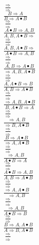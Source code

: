 \documentclass[11pt]{article}
\begin{document}
\begin{center}
\bigskip
\\$\frac{\Rightarrow }{\Rightarrow }$
\bigskip
\\$\frac{B\Rightarrow A}{B\Rightarrow A\bullet B}$
\bigskip
\\$\frac{\Rightarrow }{\Rightarrow }$
\bigskip
\\$\frac{A\bullet B\Rightarrow A, B}{A, B, A\bullet B\Rightarrow }$
\bigskip
\\$\frac{\Rightarrow }{\Rightarrow }$
\bigskip
\\$\frac{A, B, A\bullet B\Rightarrow }{A\bullet B\Rightarrow A, B}$
\bigskip
\\$\frac{\Rightarrow }{\Rightarrow }$
\bigskip
\\$\frac{A, B\Rightarrow A\bullet B}{\Rightarrow A, B, A\bullet B}$
\bigskip
\\$\frac{\Rightarrow }{\Rightarrow }$
\bigskip
\\$\frac{A, A\bullet B\Rightarrow B}{A, B\Rightarrow A\bullet B}$
\bigskip
\\$\frac{\Rightarrow }{\Rightarrow }$
\bigskip
\\$\frac{\Rightarrow A, B, A\bullet B}{B, A\bullet B\Rightarrow A}$
\bigskip
\\$\frac{\Rightarrow }{\Rightarrow }$
\bigskip
\\$\frac{\Rightarrow A, B}{\Rightarrow B, A\bullet B}$
\bigskip
\\$\frac{\Rightarrow }{\Rightarrow }$
\bigskip
\\$\frac{B\Rightarrow A\bullet B}{\Rightarrow A, A\bullet B}$
\bigskip
\\$\frac{\Rightarrow }{\Rightarrow }$
\bigskip
\\$\frac{\Rightarrow A, B}{A\bullet B\Rightarrow A}$
\bigskip
\\$\frac{\Rightarrow }{\Rightarrow }$
\bigskip
\\$\frac{A\bullet B\Rightarrow A, B}{A, B\Rightarrow A\bullet B}$
\bigskip
\\$\frac{\Rightarrow }{\Rightarrow }$
\bigskip
\\$\frac{\Rightarrow A, A\bullet B}{\Rightarrow A, B}$
\bigskip
\\$\frac{\Rightarrow }{\Rightarrow }$
\bigskip
\\$\frac{\Rightarrow A, B}{A\bullet B\Rightarrow B}$
\bigskip
\\$\frac{\Rightarrow }{\Rightarrow }$
\bigskip
\\$\frac{B\Rightarrow A, A\bullet B}{A\Rightarrow B, A\bullet B}$
\bigskip
\\$\frac{\Rightarrow }{\Rightarrow }$

\end{center}
\end{document}
